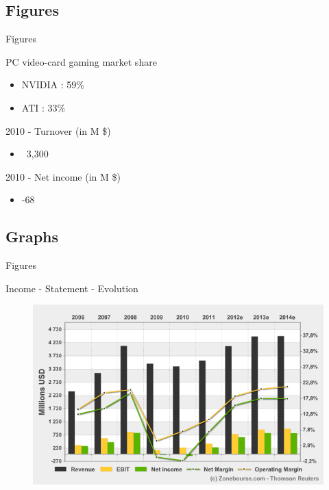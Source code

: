 \documentclass{beamer}
\begin{document}
\subsection{Figures}
\begin{frame}{Figures}
	\transdissolve[duration=0.1] %
	\begin{block}{PC video-card gaming market share}
		\begin{itemize}
			\item<+->{NVIDIA : 59\% }
			\item<+->{ATI : 33\% }
		\end{itemize}
	\end{block}	
	\begin{block}{2010 - Turnover (in M \$)}
		\begin{itemize}
			\item<+->{~3,300}
		\end{itemize}
	\end{block}
	\begin{block}{2010 - Net income (in M \$)}
		\begin{itemize}
			\item<+->{-68}
		\end{itemize}
	\end{block}
\end{frame}

\subsection{Graphs}
\begin{frame}{Figures}
	\begin{block}{Income - Statement - Evolution}
		\begin{figure}[h]
			\includegraphics[width=0.90\textheight]{./Income_Statement_Evolution.png}
		\end{figure}
	\end{block}	
\end{frame}
\end{document}
